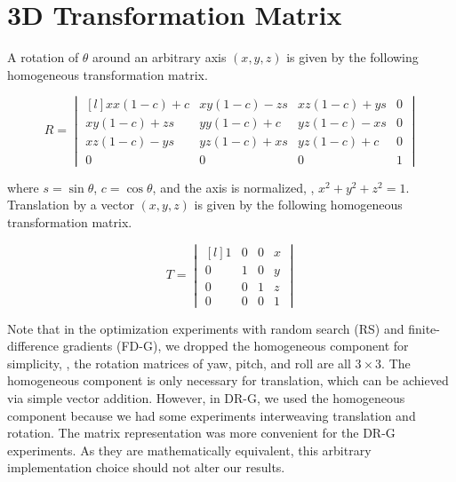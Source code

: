 \documentclass[10pt,twocolumn,letterpaper]{article}
\begin{document}
\newpage
\section{3D Transformation Matrix}\label{sec:trans-mat}

A rotation of \(\theta\) around an arbitrary axis \((x, y, z)\) is given by the
following homogeneous transformation matrix.

\begin{equation}
  \label{eq:rotation-matrix}
  R =
  \begin{vmatrix*}[l]
    x x(1 - c) + c & x y(1 - c) - z s & x z(1 - c) + y s & 0\\
    x y(1 - c) + z s & y y(1 - c) + c & y z(1 - c) - x s & 0\\
    x z(1 - c) - y s & y z(1 - c) + x s & y z(1 - c) + c & 0\\
    0 & 0 & 0 & 1
  \end{vmatrix*}
\end{equation}

\noindent
where \(s = \sin\theta\), \(c = \cos\theta\), and the axis is normalized, \ie, \(x^2 + y^2 + z^2 = 1\).
Translation by a vector \((x, y, z)\) is given by the following homogeneous
transformation matrix.

\begin{equation}
  \label{eq:translation-matrix}
  T =
  \begin{vmatrix*}[l]
    1 & 0 & 0 & x\\
    0 & 1 & 0 & y\\
    0 & 0 & 1 & z\\
    0 & 0 & 0 & 1
  \end{vmatrix*}
\end{equation}

Note that in the optimization experiments with random search (RS) and finite-difference gradients (FD-G), we dropped the homogeneous component for simplicity, \ie, the rotation matrices of yaw, pitch, and roll are all $3 \times 3$.  
The homogeneous component is only necessary for translation, which can be achieved via simple vector addition. 
However, in DR-G, we used the homogeneous component because we had some experiments interweaving translation and rotation.  
The matrix representation was more convenient for the DR-G experiments.  
As they are mathematically equivalent, this arbitrary implementation choice should not alter our results.

\newpage
\end{document}
